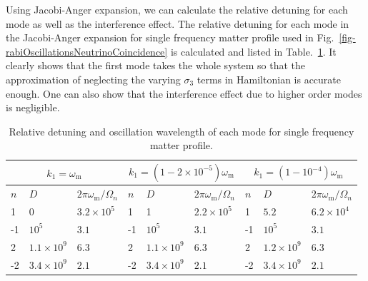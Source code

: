\documentclass[%
reprint,
 amsmath,amssymb,
 prd,
]{revtex4-1}
\newcommand{\RD}{D}
\begin{document}
Using Jacobi-Anger expansion, we can calculate the relative detuning for each mode as well as the interference effect. The relative detuning for each mode in the Jacobi-Anger expansion for single frequency matter profile used in Fig.~\ref{fig-rabiOscillationsNeutrinoCoincidence} is calculated and listed in Table.~\ref{tab-q-values-single-frequency-example}. It clearly shows that the first mode takes the whole system so that the approximation of neglecting the varying $\sigma_3$ terms in Hamiltonian is accurate enough. One can also show that the interference effect due to higher order modes is negligible.






\begin{table}
\caption{\label{tab-q-values-single-frequency-example}Relative detuning and oscillation wavelength of each mode for single frequency matter profile.} 
\begin{ruledtabular} 
\begin{tabular}{lll|lll|lll}
 \multicolumn{3}{c|}{$k_1=\omega_{\mathrm m}$} & \multicolumn{3}{c|}{$k_1=(1-2\times 10^{-5})\omega_{\mathrm{m}}$} & \multicolumn{3}{c}{$k_1=(1-10^{-4})\omega_{\mathrm m}$} \\
\hline
   $n$ & $\RD$ & $2\pi\omega_{\mathrm m}/\Omega_n$ & $n$ & $\RD$ & $2\pi\omega_{\mathrm m}/\Omega_n$ & $n$ & $\RD$ & $2\pi\omega_{\mathrm m}/\Omega_n$  \\
\hline 
 1 &	0  &    $3.2\times10^5$   & 1 &	1  &   $2.2\times 10^5$       & 1   &	$5.2$ &  $6.2\times10^4$   \\
-1 &	$10^5$ &    $3.1$     &     -1 &	$10^5$ &    $3.1$               &  -1 &	$10^5$  & $3.1$  \\
2 &	$1.1\times 10^9$  &   $6.3$    &  2 & 	$1.1\times 10^9$ &    $6.3$   &  2  &	$1.2\times 10^9$ & $6.3$  \\
-2 &	$3.4\times 10^9$  & $2.1$ &    -2 &	$3.4\times10^9$ &  $2.1$          & -2  &	$3.4\times 10^9$ &  $2.1$  \\
\end{tabular} 
\end{ruledtabular} 
\end{table}
\end{document}
